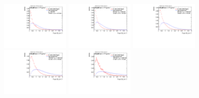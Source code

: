 \begin{figure}[H]
\bigskip
\includegraphics[width=0.3\textwidth]{sascha_input/Appendix/Distributions/higgs/distributions/beta17/h_normal_tj_D2_17_bin1.pdf} \hspace{1mm}
\includegraphics[width=0.3\textwidth]{sascha_input/Appendix/Distributions/higgs/distributions/beta17/h_normal_tj_D2_17_bin2.pdf} \hspace{4mm}
\includegraphics[width=0.3\textwidth]{sascha_input/Appendix/Distributions/higgs/distributions/beta17/h_normal_tj_D2_17_bin3.pdf} 
\bigskip
\includegraphics[width=0.3\textwidth]{sascha_input/Appendix/Distributions/higgs/distributions/beta17/h_normal_tj_D2_17_bin4.pdf} \hspace{4mm}
\includegraphics[width=0.3\textwidth]{sascha_input/Appendix/Distributions/higgs/distributions/beta17/h_normal_tj_D2_17_bin5.pdf} 


\end{figure}
